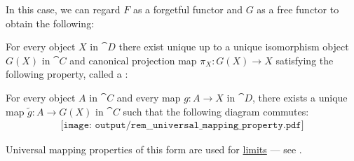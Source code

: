 \begin{remark}
  In this case, we can regard \( F \) as a forgetful functor and \( G \) as a free functor to obtain the following:
  \begin{displayquote}
    For every object \( X \) in \( \cat{D} \) there exist unique up to a unique isomorphism object \( G(X) \) in \( \cat{C} \) and canonical projection map \( \pi_X: G(X) \to X \) satisfying the following property, called a :
    \begin{displayquote}
      For every object \( A \) in \( \cat{C} \) and every map \( g: A \to X \) in \( \cat{D} \), there exists a unique map \( \widetilde{g}: A \to G(X) \) in \( \cat{C} \) such that the following diagram commutes:
      \begin{equation}\label{eq:rem:universal_mapping_property/d_triangle_forgetful}
        \begin{aligned}
          \texttt{[image: output/rem\_\_universal\_mapping\_property.pdf]}
        \end{aligned}
      \end{equation}
    \end{displayquote}
  \end{displayquote}

  Universal mapping properties of this form are used for \hyperref[def:category_of_cones/limit]{limits} --- see .
\end{remark}
